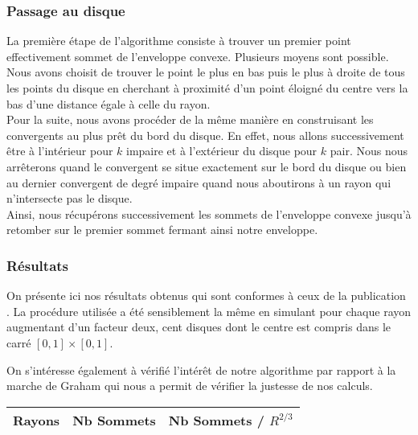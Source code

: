 \subsubsection{Passage au disque}

La première étape de l'algorithme consiste à trouver un premier point effectivement sommet de l'enveloppe convexe. Plusieurs moyens sont possible. Nous avons choisit de trouver le point le plus en bas puis le plus à droite de tous les points du disque en cherchant à proximité d'un point éloigné du centre vers la bas d'une distance égale à celle du rayon.\\ 


Pour la suite, nous avons procéder de la même manière en construisant les convergents au plus prêt du bord du disque. En effet, nous allons successivement être à l'intérieur pour $k$ impaire et à l'extérieur du disque pour $k$ pair. Nous nous arrêterons quand le convergent se situe exactement sur le bord du disque ou bien au dernier convergent de degré impaire quand nous aboutirons à un rayon qui n'intersecte pas le disque.\\

Ainsi, nous récupérons successivement les sommets de l'enveloppe convexe jusqu'à retomber sur le premier sommet fermant ainsi notre enveloppe.


\subsubsection{Résultats}


On présente ici nos résultats obtenus qui sont conformes à ceux de la publication \cite{HarPeled98}. La procédure utilisée a été sensiblement la même en simulant pour chaque rayon augmentant d'un facteur deux, cent disques dont le centre est compris dans le carré $[0,1]\times[0,1]$.

On s'intéresse également à vérifié l'intérêt de notre algorithme par rapport à la marche de Graham qui nous a permit de vérifier la justesse de nos calculs. 


\begin{tabular}{|l||c|c|}
\hline
Rayons & Nb Sommets & Nb Sommets / $R^{2/3}$\\
\hline

\hline
\end{tabular} 


